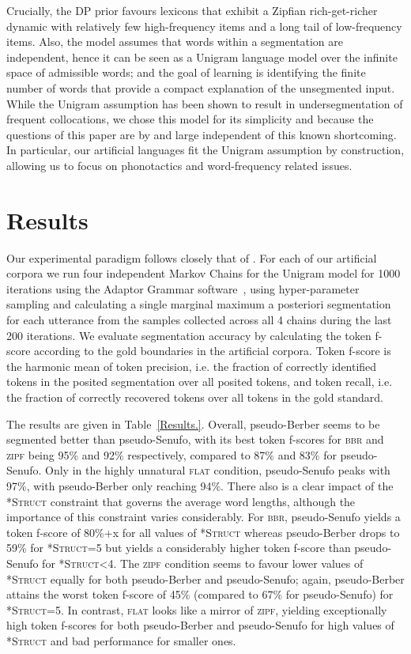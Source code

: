 \documentclass[11pt]{article}
\begin{document}
Crucially, the DP prior favours lexicons that exhibit a Zipfian rich-get-richer dynamic with relatively few high-frequency items and a long tail of low-frequency items. Also, the model assumes that words within a segmentation are independent, hence it can be seen as a Unigram language model over the infinite space of admissible words; and the goal of learning is identifying the finite number of words that provide a compact explanation of the unsegmented input. While the Unigram assumption has been shown to result in undersegmentation of frequent collocations, we chose this model for its simplicity and because the questions of this paper are by and large independent of this known shortcoming. In particular, our artificial languages fit the Unigram assumption by construction, allowing us to focus on phonotactics and word-frequency related issues.

\section{Results}
\vspace*{-5pt}
Our experimental paradigm follows closely that of \cite{Johnson09a}. For each of our artificial corpora we run four independent Markov Chains for the Unigram model for 1000 iterations using the Adaptor Grammar software~\cite{Johnson07c}, using hyper-parameter sampling and calculating a single marginal maximum a posteriori segmentation for each utterance from the samples collected across all 4 chains during the last 200 iterations. We evaluate segmentation accuracy by calculating the token f-score according to the gold boundaries in the artificial corpora. Token f-score is the harmonic mean of token precision, i.e. the fraction of correctly identified tokens in the posited segmentation over all posited tokens, and token recall, i.e. the fraction of correctly recovered tokens over all tokens in the gold standard. 

The results are given in Table~\ref{Results.}. Overall, pseudo-Berber seems to be segmented better than pseudo-Senufo, with its best token f-scores for \textsc{bbr} and \textsc{zipf} being 95\% and 92\% respectively, compared to 87\% and 83\% for pseudo-Senufo. Only in the highly unnatural \textsc{flat} condition, pseudo-Senufo peaks with 97\%, with pseudo-Berber only reaching 94\%. There also is a clear impact of the \textsc{*Struct} constraint that governs the average word lengths, although the importance of this constraint varies considerably. For \textsc{bbr}, pseudo-Senufo yields a token f-score of 80\%+x for all values of \textsc{*Struct} whereas pseudo-Berber drops to 59\% for \textsc{*Struct}=5 but yields a considerably higher token f-score than pseudo-Senufo for \textsc{*Struct}<4. The \textsc{zipf} condition seems to favour lower values of \textsc{*Struct} equally for both pseudo-Berber and pseudo-Senufo; again, pseudo-Berber attains the worst token f-score of 45\% (compared to 67\% for pseudo-Senufo) for \textsc{*Struct}=5. In contrast, \textsc{flat} looks like a mirror of \textsc{zipf}, yielding exceptionally high token f-scores for both pseudo-Berber and pseudo-Senufo for high values of \textsc{*Struct} and bad performance for smaller ones.
\end{document}
